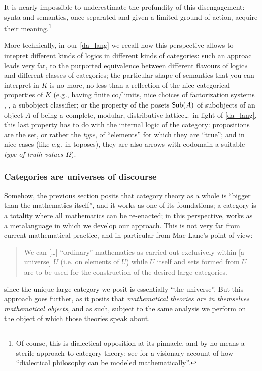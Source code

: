It is nearly impossible to underestimate the profundity of this disengagement: synta and semantics, once separated and given a limited ground of action, acquire their meaning.\footnote{Of course, this is dialectical opposition at its pinnacle, and by no means a sterile approach to category theory; see \cite{lawvere1996unity} for a visionary account of how ``dialectical philosophy can be modeled mathematically''.}

More technically, in our \autoref{da_lang} we recall how this perspective allows to intepret different kinds of logics in different kinds of categories: such an approac leads very far, to the purported equivalence between different flavours of logic\emph{s} and different classes of categories; the particular shape of semantics that you can interpret in $K$ is no more, no less than a reflection of the nice categorical properties of $K$ (e.g., having finite co/limits, nice choices of factorization systems \cite[??]{Bor1}, \cite{FK}, a subobject classifier; or the property of the posets $\mathsf{Sub}(A)$ of subobjects of an object $A$ of being a complete, modular, distributive lattice\dots --in light of \autoref{da_lang}, this last property has to do with the internal logic of the category: propositions are the set, or rather the \emph{type}, of ``elements'' for which they are ``true''; and in nice cases (like e.g. in toposes), they are also arrows with codomain a suitable \emph{type of truth values} $\Omega$).
\subsubsection{Categories are universes of discourse}
Somehow, the previous section posits that category theory as a whole is ``bigger than the mathematics itself'', and it works as one of its foundations; a category is a totality where all mathematics can be re-enacted; in this perspective,  works as a metalanguage in which we develop our approach. This is not very far from current mathematical practice, and in particular from Mac Lane's point of view:
\begin{quote}
	We can [\dots\unkern] ``ordinary'' mathematics as carried out exclusively within [a universe] $U$ (i.e. on elements of $U$) while $U$ itself and sets formed from $U$ are to be used for the construction of the desired large categories.\hfill \cite[I.6]{McL}
\end{quote}
since the unique large category we posit is essentially ``the universe''. But this approach goes further, as it posits that \emph{mathematical theories are in themselves mathematical objects}, and as such, subject to the same analysis we perform on the object of which those theories speak about.%

